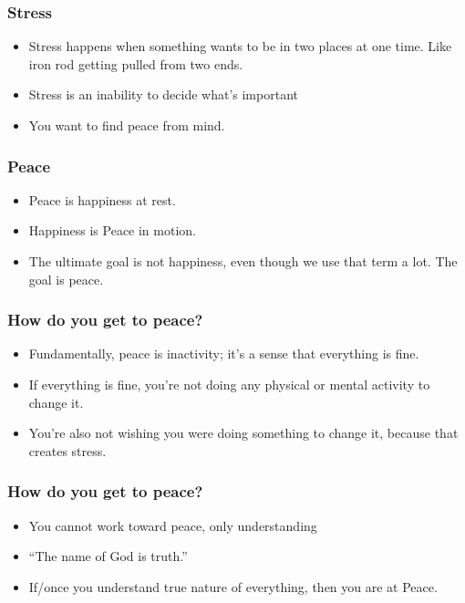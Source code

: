 \begin{frame}[fragile]\frametitle{Stress}

	\begin{itemize}
	\item Stress happens when something wants to be in two places at one time. Like iron rod getting pulled from two ends.
	\item Stress is an inability to decide what’s important
	\item You want to find peace from mind. 
	\end{itemize}

\end{frame}

\begin{frame}[fragile]\frametitle{Peace}

	\begin{itemize}
	\item Peace is happiness at rest.
	\item Happiness is Peace in motion.
	\item The ultimate goal is not happiness, even though we use that term a lot. The goal is peace.
	\end{itemize}

\end{frame}

\begin{frame}[fragile]\frametitle{How do you get to peace?}

	\begin{itemize}
	\item Fundamentally, peace is inactivity; it’s a sense that everything is fine.
	\item If everything is fine, you’re not doing any physical or mental activity to change it. 
	\item You’re also not wishing you were doing something to change it, because that creates stress. 
	\end{itemize}

\end{frame}

\begin{frame}[fragile]\frametitle{How do you get to peace?}

	\begin{itemize}
	\item You cannot work toward peace, only understanding
	\item ``The name of God is truth.''
	\item If/once you understand true nature of everything, then you are at Peace.
	\end{itemize}

\end{frame}

